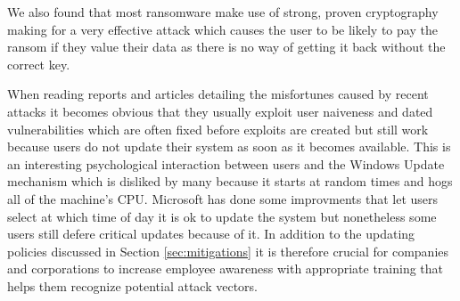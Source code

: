 \documentclass[10pt,a4paper]{article}
\begin{document}
We also found that most ransomware make use of strong, proven cryptography making for a very effective attack which causes the user to be likely to pay the ransom if they value their data as there is no way of getting it back without the correct key.

When reading reports and articles detailing the misfortunes caused by recent attacks it becomes obvious that they usually exploit user naiveness and dated vulnerabilities which are often fixed before exploits are created but still work because users do not update their system as soon as it becomes available. This is an interesting psychological interaction between users and the Windows Update mechanism which is disliked by many because it starts at random times and hogs all of the machine's CPU. Microsoft has done some improvments that let users select at which time of day it is ok to update the system but nonetheless some users still defere critical updates because of it. In addition to the updating policies discussed in Section \ref{sec:mitigations} it is therefore crucial for companies and corporations to increase employee awareness with appropriate training that helps them recognize potential attack vectors.



\newpage
\end{document}
